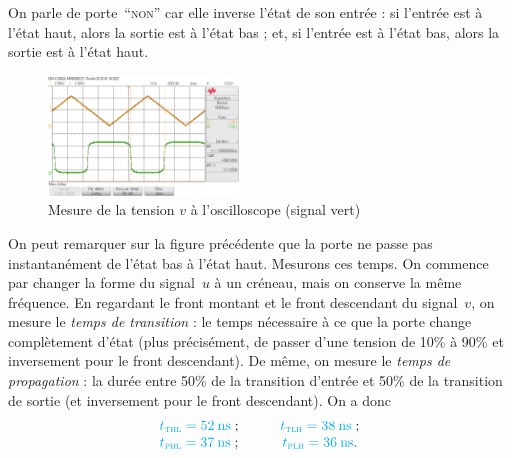 \documentclass[a4paper,twocolumn,10pt]{report}
\def\n#1{{\color{black}#1}}
\begin{document}
	On parle de porte~``\textsc{non}'' car elle inverse l'état de son entrée : si l'entrée est à l'état haut, alors la sortie est à l'état bas ; et, si l'entrée est à l'état bas, alors la sortie est à l'état haut.
	\begin{figure}[H]
		\centering
		\includegraphics[width=0.45\textwidth]{figures/scope_5.png}
		\caption{Mesure de la tension $v$\/ à l'oscilloscope (signal vert)}
	\end{figure}
	On peut remarquer sur la figure précédente que la porte ne passe pas instantanément de l'état bas à l'état haut. Mesurons ces temps.
	On commence par changer la forme du signal~$u$\/ à un créneau, mais on conserve la même fréquence.
	En regardant le front montant et le front descendant du signal~$v$, on mesure le \textit{temps de transition} : le temps nécessaire à ce que la porte change complètement d'état (plus précisément, de passer d'une tension de 10\:\% à 90\:\% et inversement pour le front descendant).
	De même, on mesure le \textit{temps de propagation} : la durée entre 50\:\% de la transition d'entrée et 50\:\% de la transition de sortie (et inversement pour le front descendant). On a donc
	 \[
		\color{cyan}
		\begin{array}{cc}
			t_\text{\textsc{thl}} = 52\:\mathrm{ns}\n{\;;}\quad&\quad t_\text{\textsc{tlh}} = 38\:\mathrm{ns}\n{\;;}\\
			t_\text{\textsc{phl}} = 37\:\mathrm{ns}\n{\;;}\quad&\quad t_\text{\textsc{plh}} = 36\:\mathrm{ns}\n.\\
		\end{array}
	\]
\end{document}
